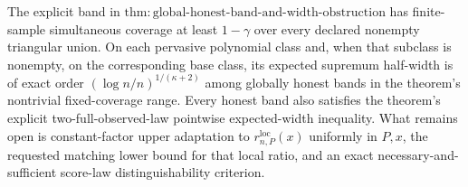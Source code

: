 The explicit band in \(\mathrm{thm:global\text{-}honest\text{-}band\text{-}and\text{-}width\text{-}obstruction}\) has finite-sample simultaneous coverage at least \(1-\gamma\) over every declared nonempty triangular union.  On each pervasive polynomial class and, when that subclass is nonempty, on the corresponding base class, its expected supremum half-width is of exact order \((\log n/n)^{1/(\kappa+2)}\) among globally honest bands in the theorem's nontrivial fixed-coverage range.  Every honest band also satisfies the theorem's explicit two-full-observed-law pointwise expected-width inequality.  What remains open is constant-factor upper adaptation to \(r_{n,P}^{\mathrm{loc}}(x)\) uniformly in \(P,x\), the requested matching lower bound for that local ratio, and an exact necessary-and-sufficient score-law distinguishability criterion.